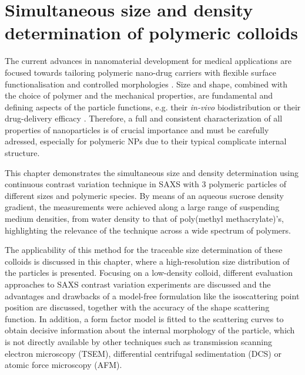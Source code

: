 \chapter{Simultaneous size and density determination of polymeric colloids}
\label{chap:simultaneous_size_density}
The current advances in nanomaterial development for medical applications are focused towards tailoring polymeric nano-drug carriers with flexible surface functionalisation and controlled morphologies \citep{euliss_imparting_2006,yang_shape-memory_2005}. Size and shape, combined with the choice of polymer and the mechanical properties, are fundamental and defining aspects of the particle functions, e.g. their \emph{in-vivo} biodistribution \citep{vittaz_effect_1996,mitragotri_physical_2009,doshi_designer_2009} or their drug-delivery efficacy \citep{powers_research_2006}. Therefore, a full and consistent characterization of all properties of nanoparticles is of crucial importance and must be carefully adressed, especially for polymeric NPs due to their typical complicate internal structure.

This chapter demonstrates the simultaneous size and density determination using continuous contrast variation technique in SAXS with 3 polymeric particles of different sizes and polymeric species. By means of an aqueous sucrose density gradient, the measurements were achieved along a large range of suspending medium densities, from water density to that of poly(methyl methacrylate)'s, highlighting the relevance of the technique across a wide spectrum of polymers.

The applicability of this method for the traceable size determination of these colloids is discussed in this chapter, where a high-resolution size distribution of the particles is presented. Focusing on a low-density colloid, different evaluation approaches to SAXS contrast variation experiments are discussed and the advantages and drawbacks of a model-free formulation like the isoscattering point position are discussed, together with the accuracy of the shape scattering function. In addition, a form factor model is fitted to the scattering curves to obtain decisive information about the internal morphology of the particle, which is not directly available by other techniques such as transmission scanning electron microscopy (TSEM), differential centrifugal sedimentation (DCS) \citep{fielding_correcting_2012} or atomic force microscopy (AFM). 

